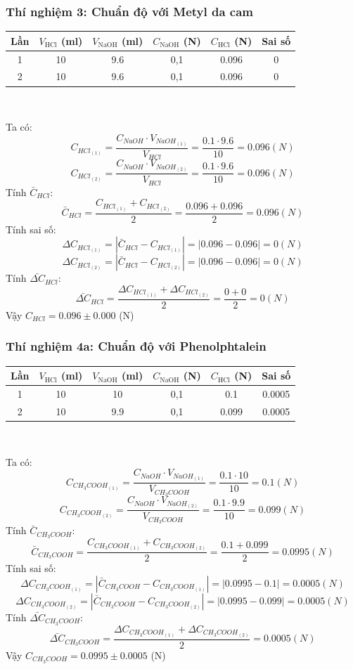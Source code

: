\documentclass[12pt]{article}
\begin{document}
\subsubsection{Thí nghiệm 3: Chuẩn độ  với Metyl da cam}
\begin{center}
    \begin{tabular}{|c|c|c|c|c|c|}
    \hline
    Lần & $V_\mathrm{HCl}$ (ml) & $V_\mathrm{NaOH}$ (ml) & $C_\mathrm{NaOH}$ (N) & $C_\mathrm{HCl}$ (N) & Sai số \\
    \hline
    1 & 10 & 9.6 & 0,1 & 0.096  & 0 \\
    \hline
    2 & 10 & 9.6 & 0,1 & 0.096 & 0  \\
    \hline
    \end{tabular} \\
\end{center}
Ta có:
\[
{C_{HCl_{(1)}} = \frac{C_{NaOH} \cdot V_{NaOH_{(1)}}}{V_{HCl}} = \frac{0.1 \cdot 9.6}{10}}= 0.096  (N)
\]
\[
{C_{HCl_{(2)}} = \frac{C_{NaOH} \cdot V_{NaOH_{(2)}}}{V_{HCl}} = \frac{0.1 \cdot 9.6}{10}}= 0.096  (N)
\]
Tính $\bar{C}_{HCl}$:
\[
\bar{C}_{HCl} = \frac{C_{HCl_{(1)}} + C_{HCl_{(2)}}}{2} = \frac{0.096 + 0.096 }{2} = 0.096 (N)
\]
Tính sai số:
\[
\Delta C_{HCl_{(1)}} = \left| \bar{C}_{HCl}  -  C_{HCl_{(1)}}\right| = \left|  0.096 - 0.096  \right| = 0 (N)
\]
\[
\Delta C_{HCl_{(2)}} = \left| \bar{C}_{HCl}  -  C_{HCl_{(2)}}\right| = \left|  0.096 - 0.096  \right| = 0 (N)
\]
Tính $\bar{\Delta C}_{HCl}$:
\[
\bar{\Delta C}_{HCl} = \frac{\Delta C_{HCl_{(1)}} + \Delta C_{HCl_{(2)}}}{2} = \frac{ 0 + 0}{2} = 0(N)
\]
Vậy ${C_{HCl}} = 0.096 \pm 0.000 $ (N)
\subsubsection{Thí nghiệm 4a: Chuẩn độ  với Phenolphtalein}
\begin{center}
    \begin{tabular}{|c|c|c|c|c|c|}
    \hline
    Lần & $V_\mathrm{HCl}$ (ml) & $V_\mathrm{NaOH}$ (ml) & $C_\mathrm{NaOH}$ (N) & $C_\mathrm{HCl}$ (N) & Sai số \\
    \hline
    1 & 10 & 10  & 0,1 & 0.1  & 0.0005\\
    \hline
    2 & 10 & 9.9 & 0,1 & 0.099 &  0.0005 \\
    \hline
    \end{tabular} \\
\end{center}
Ta có: 
\[
{C_{CH_3COOH_{(1)}} = \frac{C_{NaOH} \cdot V_{NaOH_{(1)}}}{V_{CH_3COOH}} = \frac{0.1 \cdot 10}{10}}= 0.1  (N)
\]
\[
{C_{CH_3COOH_{(2)}} = \frac{C_{NaOH} \cdot V_{NaOH_{(2)}}}{V_{CH_3COOH}} = \frac{0.1 \cdot 9.9}{10}} = 0.099(N)
\]
Tính $\bar{C}_{CH_3COOH}$:
\[
\bar{C}_{CH_3COOH} = \frac{C_{CH_3COOH_{(1)}} +C_{CH_3COOH_{(2)}}}{2} = \frac{0.1 + 0.099}{2}= 0.0995 (N)
\]
Tính sai số:
\[
\Delta C_{CH_3COOH_{(1)}} = \left| \bar{C}_{CH_3COOH}  -  C_{CH_3COOH_{(1)}}\right| = \left|  0.0995 - 0.1   \right| = 0.0005 (N)
\]
\[
\Delta C_{CH_3COOH_{(2)}} = \left| \bar{C}_{CH_3COOH}  -  C_{CH_3COOH_{(2)}}\right| = \left|  0.0995 - 0.099  \right| = 0.0005 (N)
\]
Tính $\bar{\Delta C}_{CH_3COOH}$:
\[
\bar{\Delta C}_{CH_3COOH} = \frac{\Delta C_{CH_3COOH_{(1)}} + \Delta C_{CH_3COOH_{(2)}}}{2} = 0.0005 (N)
\]
Vậy $C_{CH_3COOH} = 0.0995 \pm 0.0005$ (N)
\end{document}
